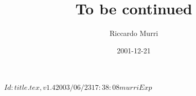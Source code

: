 \RCSID $Id: title.tex,v 1.4 2003/06/23 17:38:08 murri Exp $


\title{To be continued}
\date{2001-12-21}
\author{Riccardo Murri}
\address{%
  Scuola Normale Superiore \\
  p.za dei Cavalieri, 7 \\
  56127 Pisa \\
  Italy
  }

\maketitle

\setcounter{tocdepth}{2} %

\tableofcontents

